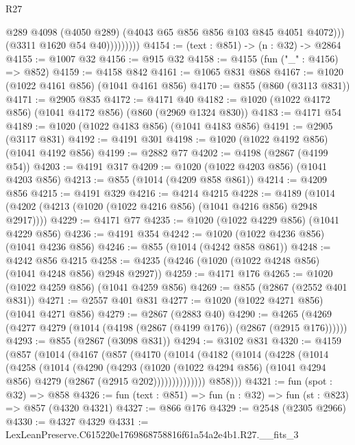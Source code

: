 \begin{lexlean}{R27}
\begin{coremodule}
                        @289
                        @4098
                        (@4050 @289)
                        (@4043 @65 @856 @856 @103 @845 @4051 @4072)))
                    (@3311 @1620 @54 @40)))))))))
@4154 := (text : @851) -> (n : @32) -> @2864
@4155 := @1007 @32
@4156 := @915 @32
@4158 := @4155 (fun ("_" : @4156) => @852)
@4159 := @4158 @842
@4161 := @1065 @831 @868
@4167 := @1020 (@1022 @4161 @856) (@1041 @4161 @856)
@4170 := @855 (@860 (@3113 @831))
@4171 := @2905 @835
@4172 := @4171 @40
@4182 := @1020 (@1022 @4172 @856) (@1041 @4172 @856) (@860 (@2969 @1324 @830))
@4183 := @4171 @54
@4189 := @1020 (@1022 @4183 @856) (@1041 @4183 @856)
@4191 := @2905 (@3117 @831)
@4192 := @4191 @301
@4198 := @1020 (@1022 @4192 @856) (@1041 @4192 @856)
@4199 := @2882 @77
@4202 := @4198 (@2867 (@4199 @54))
@4203 := @4191 @317
@4209 := @1020 (@1022 @4203 @856) (@1041 @4203 @856)
@4213 := @855 (@1014 (@4209 @858 @861))
@4214 := @4209 @856
@4215 := @4191 @329
@4216 := @4214 @4215
@4228 := @4189 (@1014 (@4202 (@4213 (@1020 (@1022 @4216 @856) (@1041 @4216 @856) @2948 @2917))))
@4229 := @4171 @77
@4235 := @1020 (@1022 @4229 @856) (@1041 @4229 @856)
@4236 := @4191 @354
@4242 := @1020 (@1022 @4236 @856) (@1041 @4236 @856)
@4246 := @855 (@1014 (@4242 @858 @861))
@4248 := @4242 @856 @4215
@4258 := @4235 (@4246 (@1020 (@1022 @4248 @856) (@1041 @4248 @856) @2948 @2927))
@4259 := @4171 @176
@4265 := @1020 (@1022 @4259 @856) (@1041 @4259 @856)
@4269 := @855 (@2867 (@2552 @401 @831))
@4271 := @2557 @401 @831
@4277 := @1020 (@1022 @4271 @856) (@1041 @4271 @856)
@4279 := @2867 (@2883 @40)
@4290 := @4265 (@4269 (@4277 @4279 (@1014 (@4198 (@2867 (@4199 @176)) (@2867 (@2915 @176))))))
@4293 := @855 (@2867 (@3098 @831))
@4294 := @3102 @831
@4320 := @4159
    (@857
      (@1014
        (@4167
          (@857
            (@4170
              (@1014
                (@4182
                  (@1014
                    (@4228
                      (@1014
                        (@4258
                          (@1014
                            (@4290
                              (@4293
                                (@1020
                                  (@1022 @4294 @856)
                                  (@1041 @4294 @856)
                                  @4279
                                  (@2867 (@2915 @202))))))))))))))
          @858)))
@4321 := fun (spot : @32) => @858
@4326 := fun (text : @851) => fun (n : @32) => fun (st : @823) => @857 (@4320 @4321)
@4327 := @866 @176
@4329 := @2548 (@2305 @2966)
@4330 := @4327 @4329
@4331 := LexLeanPreserve.C615220e1769868758816f61a54a2e4b1.R27.__fits_3

\end{coremodule}
\end{lexlean}
